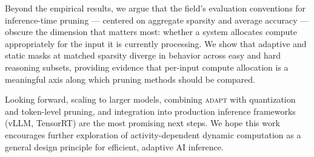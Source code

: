 \documentclass{article}
\newcommand{\system}{\textsc{adapt}}
\begin{document}
Beyond the empirical results, we argue that the field's evaluation conventions for
inference-time pruning --- centered on aggregate sparsity and average accuracy --- obscure
the dimension that matters most: whether a system allocates compute appropriately for the
input it is currently processing. We show that adaptive and static masks at matched sparsity
diverge in behavior across easy and hard reasoning subsets, providing evidence that
per-input compute allocation is a meaningful axis along which pruning methods should be
compared.

Looking forward, scaling to larger models, combining \system{} with quantization and
token-level pruning, and integration into production inference frameworks (vLLM, TensorRT)
are the most promising next steps. We hope this work encourages further exploration of
activity-dependent dynamic computation as a general design principle for efficient, adaptive
AI inference.
\end{document}
